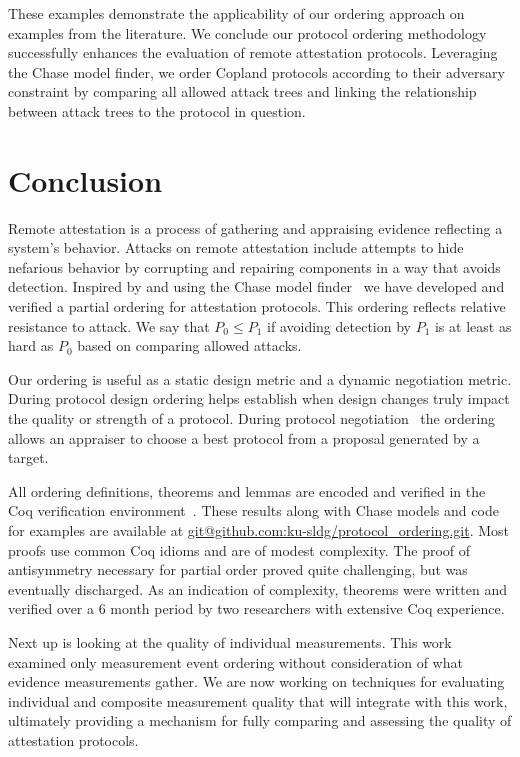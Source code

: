 \documentclass[runningheads]{llncs}
\theoremstyle{definition}
\begin{document}
These examples demonstrate the applicability of our ordering approach
on examples from the literature.  We conclude our protocol ordering
methodology successfully enhances the evaluation of remote attestation
protocols. Leveraging the Chase model finder, we order Copland
protocols according to their adversary constraint by comparing all
allowed attack trees and linking the relationship between attack
trees to the protocol in question.

\section{Conclusion}

Remote attestation is a process of gathering and appraising evidence
reflecting a system's behavior.  Attacks on remote attestation include
attempts to hide nefarious behavior by corrupting and repairing
components in a way that avoids detection.  Inspired by
\citet{Rowe:2021:OnOrdering} and using the Chase model
finder~\citep{Ramsdell:2020:Chase} we have developed and verified a
partial ordering for attestation protocols.  This ordering reflects
relative resistance to attack.  We say that $P_0\leq P_1$ if avoiding
detection by $P_1$ is at least as hard as $P_0$ based on comparing
allowed attacks.

Our ordering is useful as a static design metric and a dynamic
negotiation metric.  During protocol design ordering helps establish
when design changes truly impact the quality or strength of a
protocol.  During protocol negotiation~\citep{Fritz:2023:framework}
the ordering allows an appraiser to choose a best protocol from a
proposal generated by a target.

All ordering definitions, theorems and lemmas are encoded and verified
in the Coq verification environment~\citep{Bertot:2013aa}. These
results along with Chase models and code for examples are available at
\url{git@github.com:ku-sldg/protocol_ordering.git}.  Most proofs use
common Coq idioms and are of modest complexity.  The proof of
antisymmetry necessary for partial order proved quite challenging, but
was eventually discharged.  As an indication of complexity, theorems
were written and verified over a 6 month period by two researchers
with extensive Coq experience.

Next up is looking at the quality of individual measurements.  This
work examined only measurement event ordering without consideration of
what evidence measurements gather.  We are now working on techniques for
evaluating individual and composite measurement quality that will
integrate with this work, ultimately providing a mechanism for fully
comparing and assessing the quality of attestation protocols.
\end{document}

